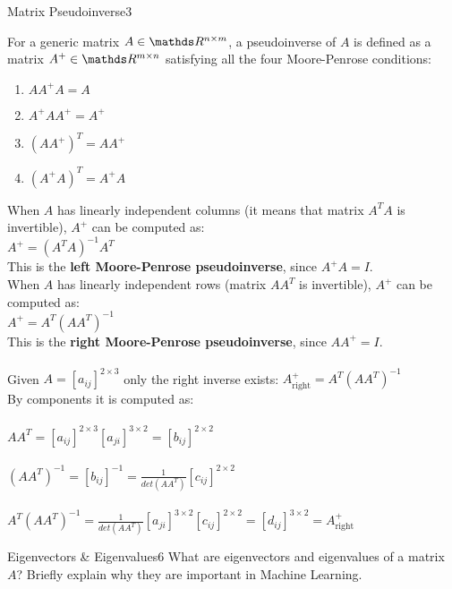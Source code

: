 \begin{questions}
\begin{question}{Matrix Pseudoinverse}{3}
\begin{answer}
For a generic matrix $ A \in \R^{n \times m} $, a pseudoinverse of $ A $ is defined as a matrix $ A^{+} \in \R^{m \times n} $ satisfying all the four Moore-Penrose conditions: \\
\begin{enumerate}
	\item $ AA^{+}A=A $ \\
	\item $ A^{+}AA^{+}= A^{+} $ \\
	\item $ (AA^{+})^{T}=AA^{+} $ \\
	\item $ (A^{+}A)^{T}=A^{+}A $  \\
\end{enumerate}
When $ A $ has linearly independent columns (it means that matrix $ A^{T}A $ is invertible), $ A^{+}$ can be computed as: \\
$ A^{+}=(A^{T}A)^{-1}A^{T} $ \\
This is the \textbf{left Moore-Penrose pseudoinverse}, since $ A^{+}A=I $. \\
When $ A $ has linearly independent rows (matrix $ AA^{T} $ is invertible), $ A^{+} $ can be computed as: \\
$ A^{+}=A^{T}(AA^{T})^{-1} $ \\
This is the \textbf{right Moore-Penrose pseudoinverse}, since $ AA^{+}=I $. \\ \\
Given $A=[a_{ij}]^{2 \times 3}$ only the right inverse exists: $ A_{\text{right}}^{+} =A^{T}(AA^{T})^{-1} $ \\
By components it is computed as: \\ \\
$ AA^{T}=[a_{ij}]^{2 \times 3}[a_{ji}]^{3 \times 2}=[b_{ij}]^{2 \times 2} $ \\ \\
$ (AA^{T})^{-1}=[b_{ij}]^{-1} = \frac{1}{det(AA^{T})}[c_{ij}]^{2 \times 2} $ \\ \\
$ A^{T}(AA^{T})^{-1} = \frac{1}{det(AA^{T})}[a_{ji}]^{3 \times 2}[c_{ij}]^{2 \times 2} = [d_{ij}]^{3 \times 2}= A_{\text{right}}^{+} $


\end{answer}
\end{question}


\begin{question}{Eigenvectors \& Eigenvalues}{6}
What are eigenvectors and eigenvalues of a matrix $A$? Briefly explain why they are important in Machine Learning.


\end{question}
\end{questions}
